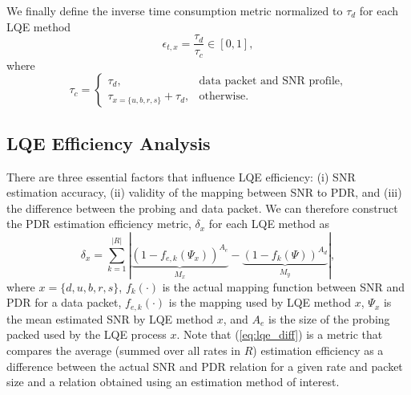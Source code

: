 \documentclass[11pt,draftclsnofoot,journal,onecolumn]{IEEEtran}
\begin{document}
We finally define the inverse time consumption metric normalized to $\tau_d$ for each LQE method
\begin{equation}
\epsilon_{t,x}=\frac{\tau_d}{\tau_c}\in[0,1],
\end{equation}
where
\begin{equation}
\tau_c=
\begin{cases}
\tau_d, & \text{data packet and SNR profile},\\
\tau_{x=\{u, b, r, s\}}+\tau_d, & \text{otherwise}.
\end{cases}
\end{equation}

\subsection{LQE Efficiency Analysis}

There are three essential factors that influence LQE efficiency: (i) SNR estimation accuracy, (ii) validity of the mapping between SNR to PDR, and (iii) the difference between the probing and data packet. We can therefore construct the PDR estimation efficiency metric, $\delta_{x}$ for each LQE method as
\begin{equation}
\delta_{x}=\sum_{k=1}^{|R|}\left|\underset{M_{x}}{\underbrace{\left(1-f_{e,k}\left(\Psi_x\right)\right)^{A_e}}}-\underset{M_y}{\underbrace{\left(1-f_k\left(\Psi\right)\right)^{A_{d}}}}\right|,
\label{eq:lqe_diff}
\end{equation}
where  $x=\{d, u, b, r, s\}$, $f_k(\cdot)$ is the actual mapping function between SNR and PDR for a data packet, $f_{e,k}(\cdot)$ is the mapping used by LQE method $x$, $\Psi_x$ is the mean estimated SNR by LQE method $x$, and $A_e$ is the size of the probing packed used by the LQE process $x$. Note that (\ref{eq:lqe_diff}) is a metric that compares the average (summed over all rates in $R$) estimation efficiency as a difference between the actual SNR and PDR relation for a given rate and packet size and a relation obtained using an estimation method of interest.
\end{document}
